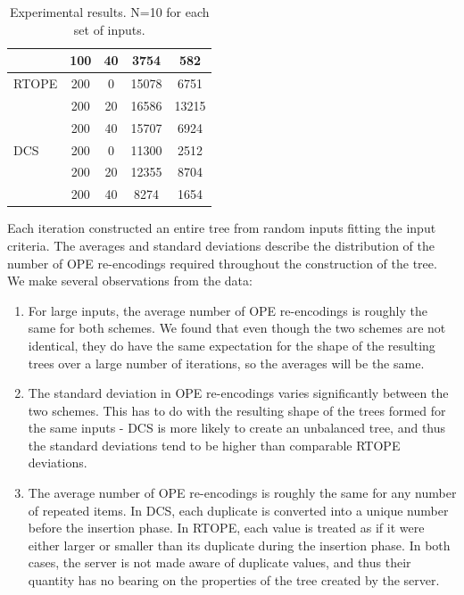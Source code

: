 \documentclass[12pt]{article}
\begin{document}
\begin{table}
\begin{tabular}{l c c c c}
      & 100 & 40  & 3754 & 582\\
      \midrule
RTOPE & 200 & 0  & 15078 & 6751 \\
      & 200 & 20  & 16586 & 13215\\
      & 200 & 40  & 15707 & 6924\\
      \midrule
DCS   & 200 & 0  & 11300 & 2512 \\
      & 200 & 20  & 12355 & 8704\\
      & 200 & 40  & 8274 & 1654\\
\bottomrule %
\end{tabular}
\caption{Experimental results. N=10 for each set of inputs.} %
\label{tab:results_table} %
\end{table}

Each iteration constructed an entire tree from random inputs fitting the input criteria. The averages and standard deviations describe the distribution of the number of OPE re-encodings required throughout the construction of the tree. We make several observations from the data:

\begin{enumerate}
\item For large inputs, the average number of OPE re-encodings is roughly the same for both schemes. We found that even though the two schemes are not identical, they do have the same expectation for the shape of the resulting trees over a large number of iterations, so the averages will be the same.
\item The standard deviation in OPE re-encodings varies significantly between the two schemes. This has to do with the resulting shape of the trees formed for the same inputs - DCS is more likely to create an unbalanced tree, and thus the standard deviations tend to be higher than comparable RTOPE deviations.
\item
The average number of OPE re-encodings is roughly the same for any number of repeated items. In DCS, each duplicate is converted into a unique number before the insertion phase. In RTOPE, each value is treated as if it were either larger or smaller than its duplicate during the insertion phase. In both cases, the server is not made aware of duplicate values, and thus their quantity has no bearing on the properties of the tree created by the server.
\end{enumerate}
\end{document}
